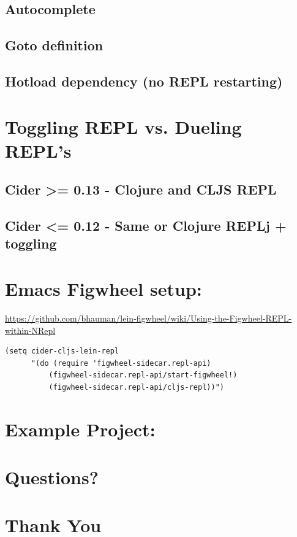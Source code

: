 \documentclass[11pt]{article}
\begin{document}
\subsection{Autocomplete}
\label{sec:orgheadline35}
\subsection{Goto definition}
\label{sec:orgheadline36}
\subsection{Hotload dependency (no REPL restarting)}
\label{sec:orgheadline37}

\section{Toggling REPL vs. Dueling REPL's}
\label{sec:orgheadline41}
\subsection{Cider >= 0.13 - Clojure and CLJS REPL}
\label{sec:orgheadline39}
\subsection{Cider <= 0.12 - Same \textbf{or} Clojure REPLj + toggling}
\label{sec:orgheadline40}

\section{Emacs Figwheel setup:}
\label{sec:orgheadline42}

\url{https://github.com/bhauman/lein-figwheel/wiki/Using-the-Figwheel-REPL-within-NRepl}

\begin{verbatim}
(setq cider-cljs-lein-repl
      "(do (require 'figwheel-sidecar.repl-api)
          (figwheel-sidecar.repl-api/start-figwheel!)
          (figwheel-sidecar.repl-api/cljs-repl))")
\end{verbatim}

\section{Example Project:}
\label{sec:orgheadline43}

\section{Questions?}
\label{sec:orgheadline44}

\section{Thank You}
\label{sec:orgheadline45}
\end{document}
